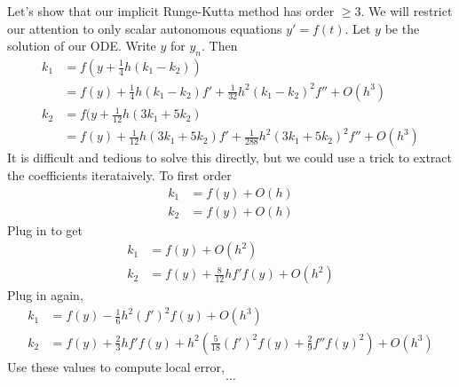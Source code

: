 \documentclass[a4paper]{article}
\begin{document}
Let's show that our implicit Runge-Kutta method has order \(\geq 3\). We will restrict our attention to only scalar autonomous equations \(y' = f(t)\). Let \(y\) be the solution of our ODE. Write \(y\) for \(y_n\). Then
\begin{align*}
  k_1 &= f(y + \frac{1}{4}h(k_1 - k_2)) \\
      &= f(y) + \frac{1}{4}h(k_1 - k_2) f' + \frac{1}{32}h^2(k_1 - k_2)^2 f'' + O(h^3) \\
  k_2 &= f(y + \frac{1}{12}h(3k_1 + 5k_2) \\
      &= f(y) + \frac{1}{12}h(3k_1 + 5k_2)f' + \frac{1}{288}h^2(3k_1 + 5k_2)^2 f'' + O(h^3)
\end{align*}
It is difficult and tedious to solve this directly, but we could use a trick to extract the coefficients iterataively. To first order
\begin{align*}
  k_1 &= f(y) + O(h) \\
  k_2 &= f(y) + O(h)
\end{align*}
Plug in to get
\begin{align*}
  k_1 &= f(y) + O(h^2) \\
  k_2 &= f(y) + \frac{8}{12}h f'f(y) + O(h^2)
\end{align*}
Plug in again,
\begin{align*}
  k_1 &= f(y) - \frac{1}{6}h^2 (f')^2f(y) + O(h^3) \\
  k_2 &= f(y) + \frac{2}{3}h f' f(y) + h^2(\frac{5}{18} (f')^2 f(y) + \frac{2}{9} f'' f(y)^2) + O(h^3)
\end{align*}
Use these values to compute local error,
\begin{align*}
  \cdots
\end{align*}

\blindtext










\printindex

\iffalse
http://damtp.cam.ac.uk/user/hf323/L18-IB-NA/
\fi
\end{document}
